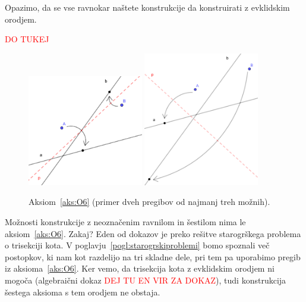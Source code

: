 Opazimo, da se vse ravnokar naštete konstrukcije da konstruirati z evklidskim orodjem.

\textcolor{red}{DO TUKEJ}












\begin{figure}[h!]
    \centering
    \includegraphics[width=0.45\textwidth]{images/origami_aksiomi/O6a.png}
    \includegraphics[width=0.45\textwidth]{images/origami_aksiomi/O6b.png}
    \caption[Aksiom~\ref{aks:O6}]{Aksiom~\ref{aks:O6} (primer dveh pregibov od najmanj treh možnih).}
    \label{fig:O6}
\end{figure}


 Možnosti konstrukcije z neoznačenim ravnilom in šestilom nima le aksiom~\ref{aks:O6}. Zakaj? Eden od dokazov je preko rešitve starogrškega problema o trisekciji kota. V poglavju~\ref{pogl:starogrskiproblemi} bomo spoznali več postopkov, ki nam kot razdelijo na tri skladne dele, pri tem pa uporabimo pregib iz aksioma~\ref{aks:O6}. Ker vemo, da trisekcija kota z evklidskim orodjem ni mogoča (algebraični dokaz \textcolor{red}{DEJ TU EN VIR ZA DOKAZ}), tudi konstrukcija šestega aksioma s tem orodjem ne obstaja.


